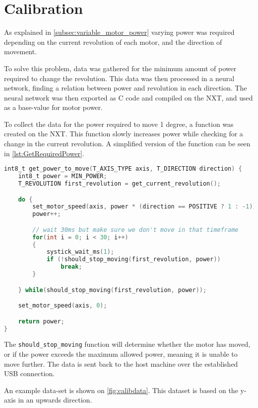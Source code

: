 \section{Calibration}\label{sec:calibration}
As explained in \autoref{subsec:variable_motor_power} varying power was required depending on the current revolution of each motor, and the direction of movement.

To solve this problem, data was gathered for the minimum amount of power required to change the revolution.
This data was then processed in a neural network, finding a relation between power and revolution in each direction.
The neural network was then exported as C code and compiled on the NXT, and used as a base-value for motor power.

To collect the data for the power required to move 1 degree, a function was created on the NXT.
This function slowly increases power while checking for a change in the current revolution. 
A simplified version of the function can be seen in \autoref{lst:GetRequiredPower}.


\begin{lstlisting}[language=C,label={lst:GetRequiredPower},caption={Getting required power to move }]
int8_t get_power_to_move(T_AXIS_TYPE axis, T_DIRECTION direction) {
	int8_t power = MIN_POWER;
	T_REVOLUTION first_revolution = get_current_revolution();

	do {
		set_motor_speed(axis, power * (direction == POSITIVE ? 1 : -1));
		power++;

		// wait 30ms but make sure we don't move in that timeframe
		for(int i = 0; i < 30; i++)
		{
			systick_wait_ms(1);
			if (!should_stop_moving(first_revolution, power))
				break;
		}

	} while(should_stop_moving(first_revolution, power));

	set_motor_speed(axis, 0);

	return power;
}

\end{lstlisting}

The \texttt{should\_stop\_moving} function will determine whether the motor has moved, or if the power exceeds the maximum allowed power, meaning it is unable to move further.
The data is sent back to the host machine over the established USB connection.


An example data-set is shown on \autoref{fig:calibdata}.
This dataset is based on the y-axis in an upwards direction.

